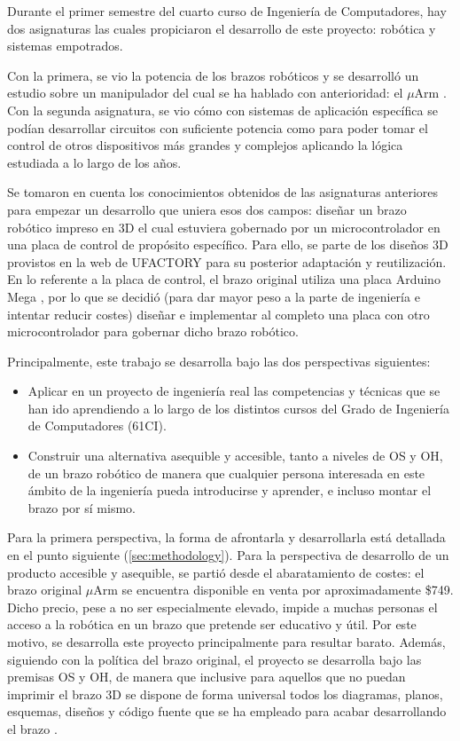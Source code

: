 Durante el primer semestre del cuarto curso de Ingeniería de Computadores,
hay dos asignaturas las cuales propiciaron el desarrollo de este proyecto: robótica
y sistemas empotrados.

Con la primera, se vio la potencia de los brazos robóticos y se desarrolló un estudio
sobre un manipulador del cual se ha hablado con anterioridad: el $\mu$Arm \cite{javieralonsosilvaUPMRoboticsUarm2019}.
Con la segunda asignatura, se vio cómo con sistemas de aplicación específica se podían
desarrollar circuitos con suficiente potencia como para poder tomar el control de otros
dispositivos más grandes y complejos aplicando la lógica estudiada a lo largo de los
años.

Se tomaron en cuenta los conocimientos obtenidos de las asignaturas anteriores
para empezar un desarrollo que uniera esos dos campos: diseñar un brazo robótico
impreso en 3D el cual estuviera gobernado por un microcontrolador en una placa de
control de propósito específico. Para ello, se parte de los diseños 3D provistos
en la web de UFACTORY \cite{ufactoryUFACTORYXArmUArm} para su posterior
adaptación y reutilización. En lo referente a la placa de control, el brazo original
utiliza una placa Arduino Mega \cite{arduinoArduinoMega2560}, por lo que se decidió (para dar
mayor peso a la parte de ingeniería e intentar reducir costes) diseñar e implementar al completo una placa con
otro microcontrolador para gobernar dicho brazo robótico.

Principalmente, este trabajo se desarrolla bajo las dos perspectivas siguientes:
\begin{itemize}
    \item Aplicar en un proyecto de ingeniería real las competencias y técnicas que 
    se han ido aprendiendo a lo largo de los distintos cursos del Grado de Ingeniería
    de Computadores (61CI).
    \item Construir una alternativa asequible y accesible, tanto a niveles de \ac{OS} y
    \ac{OH}, de un brazo robótico de manera que cualquier persona interesada en este
    ámbito de la ingeniería pueda introducirse y aprender, e incluso montar el brazo
    por sí mismo.
\end{itemize}

Para la primera perspectiva, la forma de afrontarla y desarrollarla está detallada en el
punto siguiente (\ref{sec:methodology}). Para la perspectiva de desarrollo de un
producto accesible y asequible, se partió desde el abaratamiento de costes: el brazo
original $\mu$Arm se encuentra disponible en venta por aproximadamente \$749. Dicho precio,
pese a no ser especialmente elevado, impide a muchas personas el acceso a la robótica
en un brazo que pretende ser educativo y útil. Por este motivo, se desarrolla este proyecto
principalmente para resultar barato. Además, siguiendo con la política del brazo
original, el proyecto se desarrolla bajo las premisas \ac{OS} y \ac{OH}, de manera que
inclusive para aquellos que no puedan imprimir el brazo 3D se dispone de forma universal
todos los diagramas, planos, esquemas, diseños y código fuente que se ha empleado para
acabar desarrollando el brazo \pArm{}.